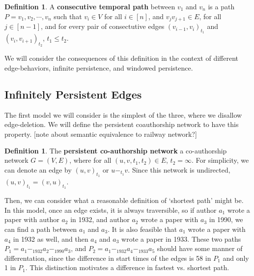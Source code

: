 \documentclass{article}
\theoremstyle{definition}
\newtheorem{defn}[thm]{Definition}
\numberwithin{thm}{subsection}
\begin{document}
\begin{defn}
  A \textbf{consecutive temporal path} between $v_1$ and $v_n$ is a path
  $P = v_1, v_2, \cdots, v_n$ such that $v_i \in V$ for all $i \in [n]$,
  and $v_jv_{j+1} \in E$, for all $j \in [n-1]$, and for every pair of
  consectutive edges $(v_{i-1},v_{i})_{t_1}$ and $(v_{i}, v_{i+1})_{t_2}$,
  $t_1 \leq t_2$.
\end{defn}

We will consider the consequences of this definition in the context of different
edge-behaviors, infinite persistence, and windowed persistence.

\subsection{Infinitely Persistent Edges}

The first model we will consider is the simplest of the three, where we disallow
edge-deletion. We will define the persistent coauthorship network to have this
property. [note about semantic equivalence to railway network?]

\begin{defn}
  The \textbf{persistent co-authorship network} a co-authorship network $G = (V,E)$,
  where for all $(u,v,t_1,t_2) \in E$, $t_2 = \infty$. For simplicity, we can
  denote an edge by $(u,v)_{t_1}$ or $u -_{t_1} v$. Since this network is
  undirected, $(u,v)_{t_1} = (v,u)_{t_1}$.
\end{defn}

\begin{center}
\end{center}

Then, we can consider what a reasonable definition of `shortest path' might be.
In this model, once an edge exists, it is always traversible, so if author
$a_1$ wrote a paper with author $a_2$ in 1932, and author $a_2$ wrote a paper with
$a_3$ in 1990, we can find a path between $a_1$ and $a_3$.  It is also feasible
that $a_1$ wrote a paper with $a_4$ in 1932 as well, and then $a_4$ and $a_3$
wrote a paper in 1933. These two paths $P_1 = a_1 -_{1932} a_2 -_{1990} a_3$, and
$P_2 = a_1 -_{1932} a_4 -_{1933} a_5$ should have some manner of differentation,
since the difference in start times of the edges is 58 in $P_1$ and only 1
in $P_1$. This distinction motivates a difference in fastest vs. shortest path.
\end{document}
